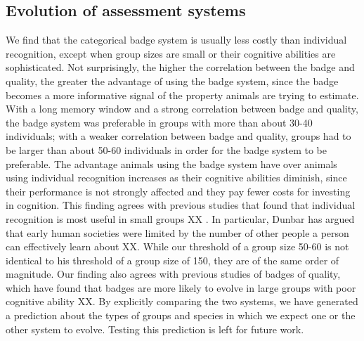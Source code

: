 \subsection*{Evolution of assessment systems} %

We find that the categorical badge system is usually less costly than individual recognition, except when group sizes are small or their cognitive abilities are sophisticated. Not surprisingly, the higher the correlation between the badge and quality, the greater the advantage of using the badge system, since the badge becomes a more informative signal of the property animals are trying to estimate. With a long memory window and a strong correlation between badge and quality, the badge system was preferable in groups with more than about 30-40 individuals; with a weaker correlation between badge and quality, groups had to be larger than about 50-60 individuals in order for the badge system to be preferable. The advantage animals using the badge system have over animals using individual recognition increases as their cognitive abilities diminish, since their performance is not strongly affected and they pay fewer costs for investing in cognition. This finding agrees with previous studies that found that individual recognition is most useful in small groups XX \cite{Veiga:1993fk}. In particular, Dunbar has argued that early human societies were limited by the number of other people a person can effectively learn about XX. While our threshold of a group size 50-60 is not identical to his threshold of a group size of 150, they are of the same order of magnitude. Our finding also agrees with previous studies of badges of quality, which have found that badges are more likely to evolve in large groups with poor cognitive ability XX. By explicitly comparing the two systems, we have generated a prediction about the types of groups and species in which we expect one or the other system to evolve. Testing this prediction is left for future work. 




